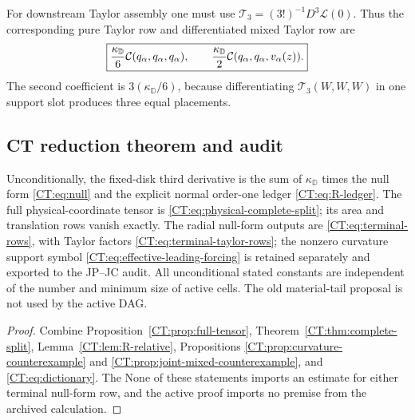 For downstream Taylor assembly one must use
$\mathcal T_3=(3!)^{-1}D^3\mathcal L(0)$.  Thus the corresponding pure
Taylor row and differentiated mixed Taylor row are
\begin{equation}\label{CT:eq:terminal-taylor-rows}
 \boxed{
 \frac{\kappa_{\mathbb D}}6
   \mathcal C(q_\alpha,q_\alpha,q_\alpha),
 \qquad
 \frac{\kappa_{\mathbb D}}2
   \mathcal C(q_\alpha,q_\alpha,v_\alpha(z)).}
\end{equation}
The second coefficient is $3(\kappa_{\mathbb D}/6)$, because
differentiating $\mathcal T_3(W,W,W)$ in one support slot produces three
equal placements.

\subsection{CT reduction theorem and audit}

\begin{theorem}
\label{CT:thm:CT}
Unconditionally, the fixed-disk third derivative is the sum of
$\kappa_{\mathbb D}$ times the null form \eqref{CT:eq:null} and the explicit
normal order-one ledger \eqref{CT:eq:R-ledger}.  The full
physical-coordinate tensor is \eqref{CT:eq:physical-complete-split}; its area
and translation rows vanish exactly.  The radial null-form outputs are
\eqref{CT:eq:terminal-rows}, with Taylor factors
\eqref{CT:eq:terminal-taylor-rows}; the nonzero curvature support symbol
\eqref{CT:eq:effective-leading-forcing} is retained separately and exported
to the JP--JC audit.  All unconditional stated constants are independent
of the number and minimum size of active cells.  The old material-tail
proposal is not used by the active DAG.
\end{theorem}

\begin{proof}
Combine Proposition~\ref{CT:prop:full-tensor}, Theorem~\ref{CT:thm:complete-split},
Lemma~\ref{CT:lem:R-relative}, Propositions
\ref{CT:prop:curvature-counterexample} and
\ref{CT:prop:joint-mixed-counterexample}, and \eqref{CT:eq:dictionary}.  The
None of these statements imports an estimate for either terminal null-form
row, and the active proof imports no premise from the archived calculation.
\end{proof}

